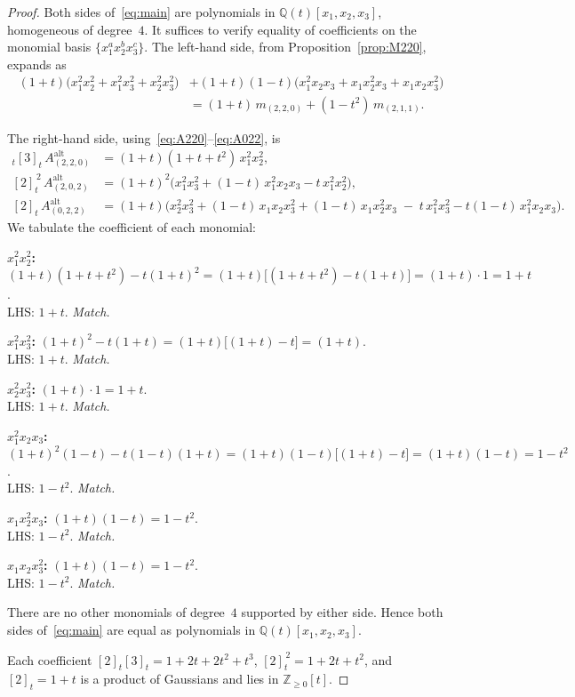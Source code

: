 \documentclass[11pt]{article}
\theoremstyle{definition}
\newcommand{\gauss}[1]{[#1]_t}
\newcommand{\Aalt}{A^{\mathrm{alt}}}
\newcommand{\ZZ}{\mathbb{Z}}
\newcommand{\QQ}{\mathbb{Q}}
\begin{document}
\begin{proof}
Both sides of~\eqref{eq:main} are polynomials in $\QQ(t)[x_1,x_2,x_3]$, homogeneous of
degree~$4$. It suffices to verify equality of coefficients on the monomial basis
$\{x_1^a x_2^b x_3^c\}$. The left-hand side, from Proposition~\ref{prop:M220}, expands as
\begin{align*}
   (1+t)\bigl(x_1^2 x_2^2 + x_1^2 x_3^2 + x_2^2 x_3^2\bigr)
     &+ (1+t)(1-t)\bigl(x_1^2 x_2 x_3 + x_1 x_2^2 x_3 + x_1 x_2 x_3^2\bigr) \\
   &= (1+t)\,m_{(2,2,0)} + (1-t^2)\,m_{(2,1,1)}.
\end{align*}

The right-hand side, using~\eqref{eq:A220}--\eqref{eq:A022}, is
\begin{align*}
   \gauss{2}\gauss{3}\,\Aalt_{(2,2,0)}
     &= (1+t)(1+t+t^2)\,x_1^2 x_2^2, \\[2pt]
   \gauss{2}^{\,2}\,\Aalt_{(2,0,2)}
     &= (1+t)^2\bigl(x_1^2 x_3^2 + (1-t)\,x_1^2 x_2 x_3 - t\,x_1^2 x_2^2\bigr), \\[2pt]
   \gauss{2}\,\Aalt_{(0,2,2)}
     &= (1+t)\bigl(x_2^2 x_3^2 + (1-t)\,x_1 x_2 x_3^2 + (1-t)\,x_1 x_2^2 x_3
        \;{-}\; t\,x_1^2 x_3^2 - t(1-t)\,x_1^2 x_2 x_3\bigr).
\end{align*}
We tabulate the coefficient of each monomial:

\medskip
\noindent\textbf{$x_1^2 x_2^2$:}\quad
$(1+t)(1+t+t^2) - t(1+t)^2 = (1+t)\bigl[(1+t+t^2)-t(1+t)\bigr] = (1+t)\cdot 1 = 1+t$. \\
LHS: $1+t$. \emph{Match.}

\medskip
\noindent\textbf{$x_1^2 x_3^2$:}\quad
$(1+t)^2 - t(1+t) = (1+t)\bigl[(1+t) - t\bigr] = (1+t)$.\\
LHS: $1+t$. \emph{Match.}

\medskip
\noindent\textbf{$x_2^2 x_3^2$:}\quad
$(1+t)\cdot 1 = 1+t$. \\
LHS: $1+t$. \emph{Match.}

\medskip
\noindent\textbf{$x_1^2 x_2 x_3$:}\quad
$(1+t)^2(1-t) - t(1-t)(1+t) = (1+t)(1-t)\bigl[(1+t)-t\bigr] = (1+t)(1-t) = 1-t^2$. \\
LHS: $1-t^2$. \emph{Match.}

\medskip
\noindent\textbf{$x_1 x_2^2 x_3$:}\quad
$(1+t)(1-t) = 1-t^2$. \\
LHS: $1-t^2$. \emph{Match.}

\medskip
\noindent\textbf{$x_1 x_2 x_3^2$:}\quad
$(1+t)(1-t) = 1-t^2$. \\
LHS: $1-t^2$. \emph{Match.}

\medskip
There are no other monomials of degree~$4$ supported by either side. Hence both sides
of~\eqref{eq:main} are equal as polynomials in $\QQ(t)[x_1,x_2,x_3]$.

Each coefficient $\gauss{2}\gauss{3} = 1+2t+2t^2+t^3$, $\gauss{2}^{\,2}=1+2t+t^2$, and
$\gauss{2}=1+t$ is a product of Gaussians and lies in $\ZZ_{\ge 0}[t]$. \qedhere
\end{proof}
\end{document}
